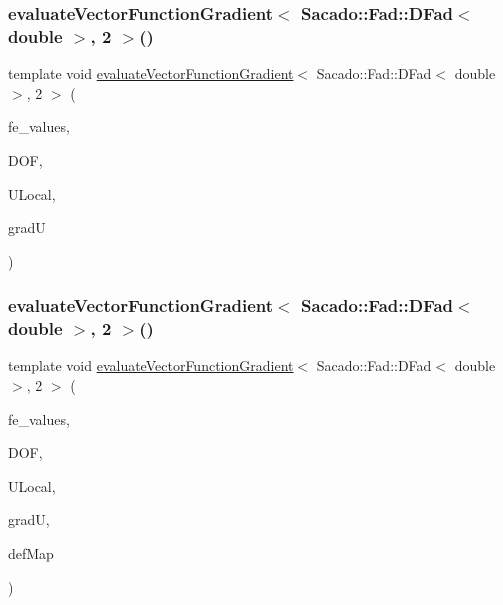 \subsubsection{\texorpdfstring{evaluateVectorFunctionGradient$<$ Sacado::Fad::DFad$<$ double $>$, 2 $>$()}{evaluateVectorFunctionGradient< Sacado::Fad::DFad< double >, 2 >()}\hspace{0.1cm}{\footnotesize\ttfamily [1/4]}}
{\footnotesize\ttfamily template void \mbox{\hyperlink{group___evaluation_functions_ga9608539d601a91aff1ba01ccc720fbe0}{evaluate\+Vector\+Function\+Gradient}}$<$ Sacado\+::\+Fad\+::\+D\+Fad$<$ double $>$, 2 $>$ (\begin{DoxyParamCaption}\item[{const F\+E\+Values$<$ 2 $>$ \&}]{fe\+\_\+values,  }\item[{unsigned int}]{D\+OF,  }\item[{Table$<$ 1, Sacado\+::\+Fad\+::\+D\+Fad$<$ double $>$$>$ \&}]{U\+Local,  }\item[{Table$<$ 3, Sacado\+::\+Fad\+::\+D\+Fad$<$ double $>$$>$ \&}]{gradU }\end{DoxyParamCaption})}

\mbox{\label{function_evaluations_8cc_a85f7c6e4046993a83815972185df45ab}} 
\subsubsection{\texorpdfstring{evaluateVectorFunctionGradient$<$ Sacado::Fad::DFad$<$ double $>$, 2 $>$()}{evaluateVectorFunctionGradient< Sacado::Fad::DFad< double >, 2 >()}\hspace{0.1cm}{\footnotesize\ttfamily [2/4]}}
{\footnotesize\ttfamily template void \mbox{\hyperlink{group___evaluation_functions_ga9608539d601a91aff1ba01ccc720fbe0}{evaluate\+Vector\+Function\+Gradient}}$<$ Sacado\+::\+Fad\+::\+D\+Fad$<$ double $>$, 2 $>$ (\begin{DoxyParamCaption}\item[{const F\+E\+Values$<$ 2 $>$ \&}]{fe\+\_\+values,  }\item[{unsigned int}]{D\+OF,  }\item[{Table$<$ 1, Sacado\+::\+Fad\+::\+D\+Fad$<$ double $>$$>$ \&}]{U\+Local,  }\item[{Table$<$ 3, Sacado\+::\+Fad\+::\+D\+Fad$<$ double $>$$>$ \&}]{gradU,  }\item[{\mbox{\hyperlink{structdeformation_map}{deformation\+Map}}$<$ Sacado\+::\+Fad\+::\+D\+Fad$<$ double $>$, 2 $>$ \&}]{def\+Map }\end{DoxyParamCaption})}

